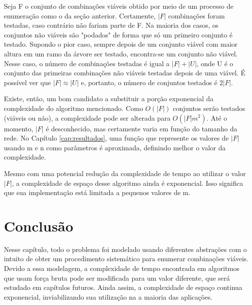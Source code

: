 Seja F o conjunto de combinações viáveis obtido por meio de um processo de enumeração como o da seção anterior. Certamente, $|F|$ combinações foram testadas, caso contrário não fariam parte de F. Na maioria dos casos, os conjuntos não viáveis são "podados" de forma que só um primeiro conjunto é testado. Supondo o pior caso, sempre depois de um conjunto viável com maior altura em um ramo da árvore ser testado, encontra-se um conjunto não viável. Nesse caso, o número de combinações testadas é igual a $|F| + |U|$, onde U é o conjunto das primeiras combinações não viáveis testadas depois de uma viável. É possível ver que $|F| \approx |U|$ e, portanto, o número de conjuntos testados é $2|F|$. 

Existe, então, um bom candidato a substituir a porção exponencial da complexidade do algoritmo mencionado. Como $O(|F|)$ conjuntos serão testados (viáveis ou não), a complexidade pode ser alterada para $O(|F|m^2)$. Até o momento, $|F|$ é desconhecido, mas certamente varia em função do tamanho da rede. No Capítulo \ref{cap:resultados}, uma função que represente os valores de $|F|$ usando m e n como parâmetros é aproximada, definindo melhor o valor da complexidade.

Mesmo com uma potencial redução da complexidade de tempo ao utilizar o valor $|F|$, a complexidade de espaço desse algoritmo ainda é exponencial. Isso significa que sua implementação está limitada a pequenos valores de m.

\section{Conclusão}

Nesse capítulo, todo o problema foi modelado usando diferentes abstrações com o intuito de obter um procedimento sistemático para enumerar combinações viáveis. Devido a essa modelagem, a complexidade de tempo encontrada em algoritmos que usam força bruta pode ser modificada para um valor diferente, que será estudado em capítulos futuros. Ainda assim, a complexidade de espaço continua exponencial, inviabilizando sua utilização na a maioria das aplicações.

